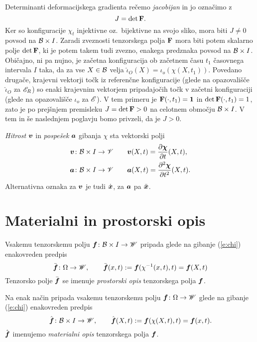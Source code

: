 Determinanti deformacijskega gradienta rečemo \emph{jacobijan} in jo označimo z
\[
	J=\det\mathbf F.
\]
Ker so konfiguracije $\chi_t$
injektivne oz.~bijektivne na svojo sliko, mora biti $J\neq 0$ povsod na $\mathcal B\times I$.
Zaradi zveznosti tenzorskega polja $\mathbf F$ mora biti potem skalarno polje $\det\mathbf F$,
ki je potem takem tudi zvezno, enakega predznaka povsod na $\mathcal B\times I$.
Običajno, ni pa nujno, je začetna konfiguracija ob začetnem času $t_1$ časovnega intervala $I$
taka, da za vse $X\in\mathcal B$ velja $\hat{\iota}_{O}(X)=\iota_o(\chi(X,t_1))$. Povedano drugače,
krajevni vektorji točk iz referenčne konfiguracije (glede na opazovališče $\hat{\iota}_{O}$ za $\mathscr E_R$)
so enaki krajevnim vektorjem pripadajočih točk v začetni konfiguraciji (glede na opazovališče $\iota_o$ za $\mathscr E$).
V tem primeru je $\mathbf F(\cdot,t_1)=\mathbf 1$ in $\det\mathbf F(\cdot,t_1)=1$, zato je po prejšnjem
premisleku $J=\det\mathbf F>0$ na celotnem območju $\mathcal B\times I$. V tem in še naslednjem poglavju bomo privzeli, da je $J>0$.

\emph{Hitrost} $\boldsymbol v$ in \emph{pospešek} $\boldsymbol a$ gibanja $\chi$ sta vektorski polji
\begin{align}
	\boldsymbol v\colon \mathcal B\times I\to \mathscr V \qquad & \boldsymbol v(X,t) = \frac{\partial\boldsymbol \chi}{\partial t}(X,t), \label{e:v} \\
	\boldsymbol a\colon \mathcal B\times I\to \mathscr V \qquad & \boldsymbol a(X,t) = \frac{\partial^2\boldsymbol \chi}{\partial t^2}(X,t). \label{e:a}
\end{align}
Alternativna oznaka za $\boldsymbol v$ je tudi $\dot{\boldsymbol x}$, za $\boldsymbol a$ pa $\ddot{\boldsymbol x}$.


\section{Materialni in prostorski opis}


Vsakemu tenzorskemu polju $\boldsymbol f\colon \mathcal B\times I\to\mathscr W$ pripada glede na gibanje
(\ref{e:chi}) enakovreden predpis
\[
	\bar{\boldsymbol f}\colon\Omega\to\mathscr W,\qquad
	\bar{\boldsymbol f}(x,t):=\boldsymbol f(\chi^{-1}(x,t),t)=\boldsymbol f(X,t)
\]
Tenzorsko polje $\bar{\boldsymbol f}$ se imenuje \emph{prostorski opis} tenzorskega polja $\boldsymbol f$.

Na enak način pripada vsakemu tenzorskemu polju $\boldsymbol f\colon\Omega\to\mathscr W$
glede na gibanje (\ref{e:chi}) enakovreden predpis
\begin{equation} \label{e:matopi}
	\hat{\boldsymbol f}\colon \mathcal B\times I\to\mathscr W,\qquad
	\hat{\boldsymbol f}(X,t):=\boldsymbol f(\chi(X,t),t)=\boldsymbol f(x,t).
\end{equation}
$\hat{\boldsymbol f}$ imenujemo \emph{materialni opis} tenzorskega polja $\boldsymbol f$.

